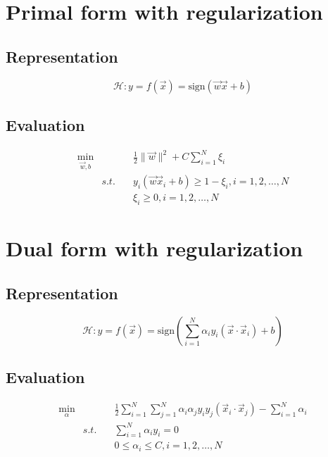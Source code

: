 \section{Primal form with regularization}


\subsection{Representation}

\begin{equation}
\mathcal{H}:y=f(\vec{x})=\text{sign}(\vec{w}\vec{x}+b)
\end{equation}


\subsection{Evaluation}

\begin{eqnarray}
\min_{\vec{w},b}  && \frac{1}{2}\|\vec{w}\|^2 + C \sum\limits_{i=1}^N\xi_i \label{eqn:pfwr1} \\
      & s.t. \quad & y_i(\vec{w}\vec{x}_i+b)\geqslant 1-\xi_i, i=1,2, \dots , N \label{eqn:pfwr2} \\
                  && \xi_i \geqslant 0, i=1,2, \dots, N \label{eqn:pfwr3}
\end{eqnarray}


\section{Dual form with regularization}


\subsection{Representation}

\begin{equation}
\mathcal{H}:y=f(\vec{x})=\text{sign}\left(\sum\limits_{i=1}^N{\alpha_iy_i(\vec{x} \cdot \vec{x}_i)}+b\right)
\end{equation}


\subsection{Evaluation}

\begin{eqnarray}
 \min_{\alpha} && \frac{1}{2} \sum\limits_{i=1}^N\sum\limits_{j=1}^N \alpha_i\alpha_j y_i y_j (\vec{x}_i \cdot \vec{x}_j) - \sum\limits_{i=1}^N \alpha_i \\
               & s.t.  \quad & \sum\limits_{i=1}^N\alpha_i y_i=0 \\
               && 0 \leqslant  \alpha_i \leqslant C, i=1,2, \dots, N
\end{eqnarray}

